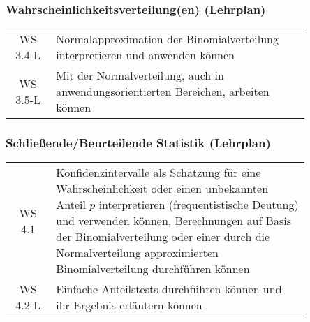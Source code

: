 \documentclass[a4paper,12pt]{article}
\begin{document}
\subsubsection{Wahrscheinlichkeitsverteilung(en) (Lehrplan)}
\begin{em}
\begin{tabular}{cp{0.85\linewidth}}
WS 3.4-L & Normalapproximation der Binomialverteilung interpretieren und anwenden können\\
WS 3.5-L & Mit der Normalverteilung, auch in anwendungsorientierten Bereichen, arbeiten können\\
\end{tabular}
\end{em}


%

\subsubsection{Schließende/Beurteilende Statistik (Lehrplan)}
\begin{em}
\begin{tabular}{cp{0.85\linewidth}}
WS 4.1 & Konfidenzintervalle als Schätzung für eine Wahrscheinlichkeit oder einen unbekannten Anteil $p$ interpretieren (frequentistische Deutung) und verwenden können, Berechnungen auf Basis der Binomialverteilung oder einer durch die Normalverteilung approximierten Binomialverteilung durchführen können\\
WS 4.2-L & Einfache Anteilstests durchführen können und ihr Ergebnis erläutern können\\
\end{tabular}
\end{em}
\end{document}
